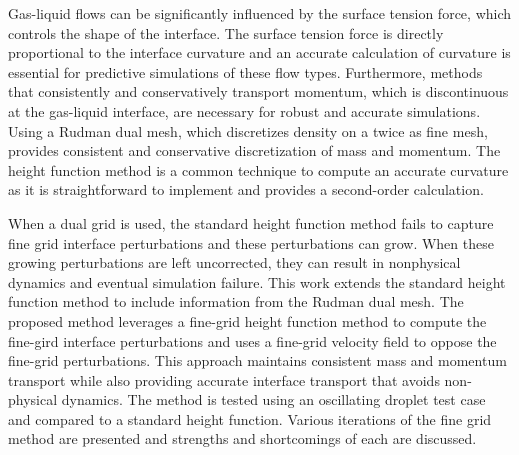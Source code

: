 
Gas-liquid flows can be significantly influenced by the surface tension force, which controls the shape of the interface. The surface tension force is directly proportional to the interface curvature and an accurate calculation of curvature is essential for predictive simulations of these flow types. Furthermore, methods that consistently and conservatively transport momentum, which is discontinuous at the gas-liquid interface, are necessary for robust and accurate simulations. Using a Rudman dual mesh, which discretizes density on a twice as fine mesh, provides consistent and conservative discretization of mass and momentum. The height function method is a common technique to compute an accurate curvature as it is straightforward to implement and provides a second-order calculation. 

When a dual grid is used, the standard height function method fails to capture fine grid interface perturbations and these perturbations can grow. When these growing perturbations are left uncorrected, they can result in nonphysical dynamics and eventual simulation failure. This work extends the standard height function method to include information from the Rudman dual mesh. The proposed method leverages a fine-grid height function method to compute the fine-gird interface perturbations and uses a fine-grid velocity field to oppose the fine-grid perturbations. This approach maintains consistent mass and momentum transport while also providing accurate interface transport that avoids non-physical dynamics. The method is tested using an oscillating droplet test case and compared to a standard height function. Various iterations of the fine grid method are presented and strengths and shortcomings of each are discussed. 